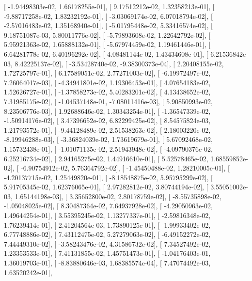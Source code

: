\documentclass{article}
\begin{document}
       [ -1.94498303e-02,   1.66178255e-01],
       [  9.17512212e-02,   1.32358213e-01],
       [ -9.88717258e-02,   1.83232192e-01],
       [ -3.03069174e-02,   6.07018794e-02],
       [ -2.57016483e-02,   1.35168940e-01],
       [ -5.01795448e-02,   5.33416574e-02],
       [  9.18751087e-03,   5.80011776e-02],
       [ -5.79893608e-02,   1.22642792e-02],
       [  5.95921363e-02,   1.65888132e-01],
       [ -5.67974459e-02,   1.19461446e-01],
       [  6.64281778e-02,   6.40196292e-02],
       [  4.08481144e-02,   1.43434608e-01],
       [  6.21536842e-03,   8.42225137e-02],
       [ -3.53428740e-02,  -9.38300373e-04],
       [  2.20408155e-02,   1.72725797e-01],
       [  6.17589051e-02,   2.77271003e-02],
       [ -6.19972497e-02,   7.26064017e-03],
       [ -4.34941801e-02,   1.19306453e-01],
       [  4.07654183e-02,   1.52626727e-01],
       [ -1.37858273e-02,   5.40283201e-02],
       [  4.13438652e-02,   7.31985175e-02],
       [ -1.04537148e-01,  -7.08011416e-03],
       [  5.90850993e-02,   8.23506776e-03],
       [  1.92688646e-02,   1.30343254e-01],
       [ -1.36547339e-02,  -1.50914176e-02],
       [  3.47396652e-02,   6.82299425e-02],
       [  8.54575824e-03,   1.21793572e-01],
       [ -9.44128489e-02,   2.51538263e-02],
       [  2.18003220e-02,  -8.19946288e-03],
       [ -3.36824039e-02,   1.73619679e-01],
       [  5.67092468e-02,   1.15732438e-01],
       [ -1.01071135e-02,   2.51943948e-02],
       [ -4.09790376e-02,   6.25216734e-02],
       [  2.94165275e-02,   1.44916610e-01],
       [  5.52578465e-02,   1.68559852e-02],
       [ -6.90754912e-02,   5.76364792e-02],
       [ -1.45450488e-02,   1.28210005e-01],
       [ -4.20137715e-02,   1.25449820e-01],
       [ -8.18548875e-02,   5.95795299e-02],
       [  5.91705345e-02,   1.62376065e-01],
       [  2.97282812e-02,   3.80744194e-02],
       [  3.55051002e-03,   1.65144198e-03],
       [  3.35652800e-02,   2.80178759e-02],
       [ -8.55735898e-02,  -1.05048025e-02],
       [  8.30487364e-02,   7.64937928e-02],
       [ -4.29050963e-02,   1.49644254e-01],
       [  3.55395245e-02,   1.13277337e-01],
       [ -2.59816348e-02,   1.76239414e-01],
       [  2.41204564e-03,   1.73890125e-01],
       [ -1.99933402e-02,   6.77748886e-02],
       [  7.43112475e-02,   5.27279063e-02],
       [ -6.49152272e-02,   7.44449310e-02],
       [ -3.58243476e-02,   4.31586732e-02],
       [  7.34527492e-02,   1.23353533e-01],
       [  7.41131855e-02,   1.45751473e-01],
       [ -1.04176403e-01,   1.36019703e-01],
       [ -8.83880646e-03,   1.68385574e-04],
       [  7.47074492e-03,   1.63520242e-01],
\end{document}
